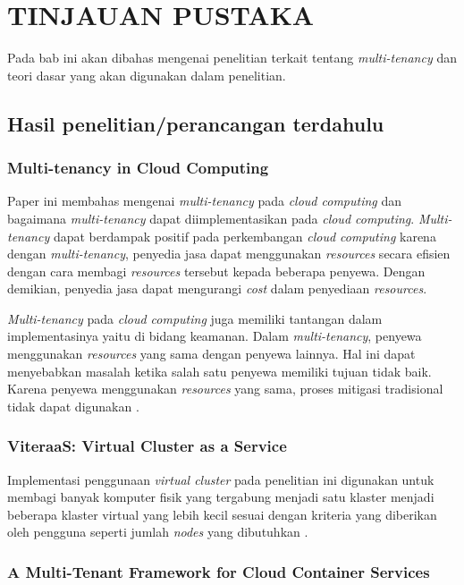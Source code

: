 \chapter{TINJAUAN PUSTAKA}

Pada bab ini akan dibahas mengenai penelitian terkait tentang \emph{multi-tenancy}
dan teori dasar yang akan digunakan dalam penelitian.

\section{Hasil penelitian/perancangan terdahulu}

\subsection{Multi-tenancy in Cloud Computing}

Paper ini membahas mengenai \emph{multi-tenancy} pada \emph{cloud computing}
dan bagaimana \emph{multi-tenancy} dapat diimplementasikan pada \emph{cloud computing}.
\emph{Multi-tenancy} dapat berdampak positif pada perkembangan \emph{cloud computing} karena
dengan \emph{multi-tenancy}, penyedia jasa dapat menggunakan \emph{resources} secara efisien
dengan cara membagi \emph{resources} tersebut kepada beberapa penyewa. Dengan demikian, penyedia
jasa dapat mengurangi \emph{cost} dalam penyediaan \emph{resources}.

\emph{Multi-tenancy} pada \emph{cloud computing} juga memiliki tantangan dalam
implementasinya yaitu di bidang keamanan. Dalam \emph{multi-tenancy}, penyewa
menggunakan \emph{resources} yang sama dengan penyewa lainnya. Hal ini dapat
menyebabkan masalah ketika salah satu penyewa memiliki tujuan tidak baik. Karena
penyewa menggunakan \emph{resources} yang sama, proses mitigasi tradisional tidak
dapat digunakan \parencite{6830928}.

\subsection{ViteraaS: Virtual Cluster as a Service}

Implementasi penggunaan \emph{virtual cluster} pada penelitian ini
digunakan untuk membagi banyak komputer fisik yang tergabung menjadi satu klaster
menjadi beberapa klaster virtual yang lebih kecil sesuai dengan kriteria yang diberikan oleh
pengguna seperti jumlah \emph{nodes} yang dibutuhkan \parencite{6133210}.

\subsection{A Multi-Tenant Framework for Cloud Container Services}

